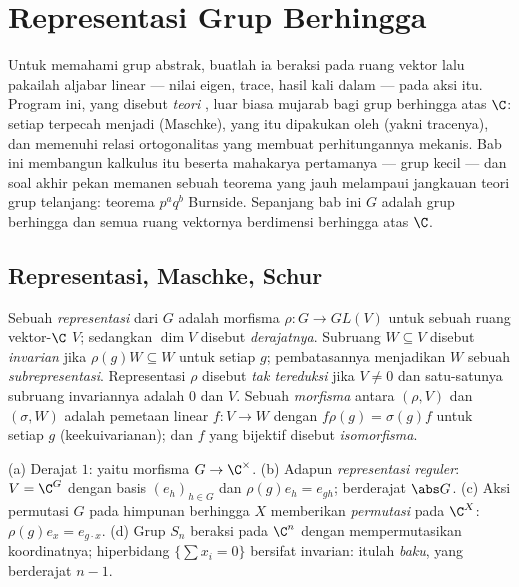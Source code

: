 \chapter{Representasi Grup Berhingga}\label{ch:b3:representations}

Untuk memahami grup abstrak, buatlah ia beraksi pada ruang vektor
lalu pakailah aljabar linear --- nilai eigen, trace, hasil kali dalam ---
pada aksi itu. Program ini, yang disebut \emph{teori },
luar biasa mujarab bagi grup berhingga atas $\C$: setiap
 terpecah menjadi  (Maschke),
yang  itu dipakukan oleh \emph{}
(yakni tracenya), dan  memenuhi relasi ortogonalitas yang
membuat perhitungannya mekanis. Bab ini membangun kalkulus itu
beserta mahakarya pertamanya ---  grup
kecil --- dan soal akhir pekan memanen sebuah teorema yang jauh melampaui
jangkauan teori grup telanjang: teorema $p^aq^b$ Burnside.
Sepanjang bab ini $G$ adalah grup berhingga dan semua ruang vektornya
berdimensi berhingga atas $\C$.

\section{Representasi, Maschke, Schur}

\begin{definition}\label{def:b3:representations:rep}
Sebuah \emph{representasi} dari $G$ adalah
morfisma $\rho \colon G \to GL(V)$ untuk sebuah ruang vektor-$\C$ $V$;
sedangkan $\dim V$ disebut \emph{derajatnya}. Subruang $W \subseteq V$ disebut
\emph{invarian} jika $\rho(g)W \subseteq W$ untuk setiap $g$;
pembatasannya menjadikan $W$ sebuah \emph{subrepresentasi}. Representasi $\rho$ disebut
\emph{tak tereduksi} jika $V \neq
0$ dan satu-satunya subruang invariannya adalah $0$ dan $V$. Sebuah
\emph{morfisma} antara $(\rho, V)$ dan $(\sigma, W)$ adalah pemetaan linear
$f\colon V \to W$ dengan $f\rho(g) = \sigma(g)f$ untuk setiap $g$
(keekuivarianan); dan $f$ yang bijektif disebut \emph{isomorfisma}.
\end{definition}

\begin{example}\label{ex:b3:representations:examples}
(a) Derajat $1$: yaitu morfisma $G \to \C^\times$.
(b) Adapun \emph{representasi reguler}: $V = \C^G$ dengan basis $(e_h)_{h \in G}$ dan
$\rho(g)e_h = e_{gh}$; berderajat $\abs G$.
(c) Aksi permutasi $G$ pada himpunan berhingga $X$ memberikan
\emph{ permutasi} pada $\C^X$: $\rho(g)e_x =
e_{g\cdot x}$.
(d) Grup $S_n$ beraksi pada $\C^n$ dengan mempermutasikan koordinatnya; hiperbidang
$\{\sum x_i = 0\}$ bersifat invarian: itulah \emph{
baku}, yang berderajat $n - 1$.
\end{example}

